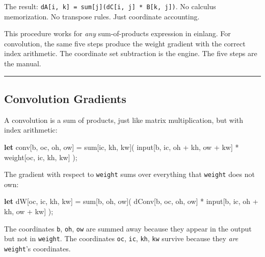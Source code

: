 \documentclass[11pt,]{article}
\newenvironment{Shaded}{}{}
\newcommand{\KeywordTok}[1]{\textcolor[rgb]{0.00,0.44,0.13}{\textbf{#1}}}
\newcommand{\NormalTok}[1]{#1}
\newcommand{\OperatorTok}[1]{\textcolor[rgb]{0.40,0.40,0.40}{#1}}
\begin{document}
The result:
\texttt{dA{[}i,\ k{]}\ =\ sum{[}j{]}(dC{[}i,\ j{]}\ *\ B{[}k,\ j{]})}.
No calculus memorization. No transpose rules. Just coordinate
accounting.

This procedure works for \emph{any} sum-of-products expression in
einlang. For convolution, the same five steps produce the weight
gradient with the correct index arithmetic. The coordinate set
subtraction is the engine. The five steps are the manual.

\begin{center}\rule{0.5\linewidth}{0.4pt}\end{center}

\hypertarget{convolution-gradients}{%
\subsection{Convolution Gradients}\label{convolution-gradients}}

A convolution is a sum of products, just like matrix multiplication, but
with index arithmetic:

\begin{Shaded}
\begin{Highlighting}[]
\KeywordTok{let}\NormalTok{ conv}\OperatorTok{[}\NormalTok{b, oc, oh, ow}\OperatorTok{]}\NormalTok{ = sum}\OperatorTok{[}\NormalTok{ic, kh, kw}\OperatorTok{]}\NormalTok{(}
\NormalTok{    input}\OperatorTok{[}\NormalTok{b, ic, oh + kh, ow + kw}\OperatorTok{]}\NormalTok{ * weight}\OperatorTok{[}\NormalTok{oc, ic, kh, kw}\OperatorTok{]}
\NormalTok{);}
\end{Highlighting}
\end{Shaded}

The gradient with respect to \texttt{weight} sums over everything that
\texttt{weight} does not own:

\begin{Shaded}
\begin{Highlighting}[]
\KeywordTok{let}\NormalTok{ dW}\OperatorTok{[}\NormalTok{oc, ic, kh, kw}\OperatorTok{]}\NormalTok{ = sum}\OperatorTok{[}\NormalTok{b, oh, ow}\OperatorTok{]}\NormalTok{(}
\NormalTok{    dConv}\OperatorTok{[}\NormalTok{b, oc, oh, ow}\OperatorTok{]}\NormalTok{ * input}\OperatorTok{[}\NormalTok{b, ic, oh + kh, ow + kw}\OperatorTok{]}
\NormalTok{);}
\end{Highlighting}
\end{Shaded}

The coordinates \texttt{b}, \texttt{oh}, \texttt{ow} are summed away
because they appear in the output but not in \texttt{weight}. The
coordinates \texttt{oc}, \texttt{ic}, \texttt{kh}, \texttt{kw} survive
because they \emph{are} \texttt{weight}'s coordinates.
\end{document}
